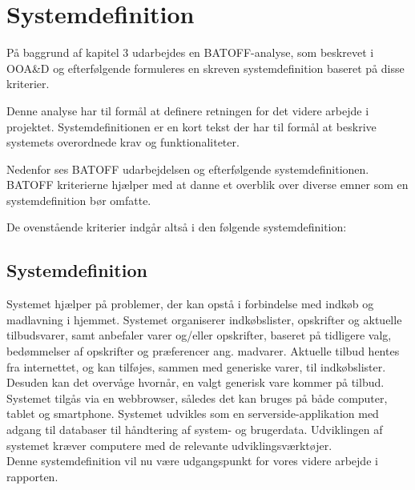 \section{Systemdefinition}
På baggrund af kapitel 3 udarbejdes en BATOFF-analyse, som beskrevet i OOA\&D\citep{OOA&D2001} og efterfølgende formuleres en skreven systemdefinition baseret på disse kriterier.

Denne analyse har til formål at definere retningen for det videre arbejde i projektet.
Systemdefinitionen er en kort tekst der har til formål at beskrive systemets overordnede krav og funktionaliteter.

Nedenfor ses BATOFF udarbejdelsen og efterfølgende systemdefinitionen.
BATOFF kriterierne hjælper med at danne et overblik over diverse emner som en systemdefinition bør omfatte.



De ovenstående kriterier indgår altså i den følgende systemdefinition:

\subsection{Systemdefinition}\label{Sysdef}

Systemet hjælper på problemer, der kan opstå i forbindelse med indkøb og madlavning i hjemmet.
Systemet organiserer indkøbslister, opskrifter og aktuelle tilbudsvarer, samt anbefaler varer og/eller opskrifter, baseret på tidligere valg, bedømmelser af opskrifter og præferencer ang. madvarer.
Aktuelle tilbud hentes fra internettet, og kan tilføjes, sammen med generiske varer, til indkøbslister.
Desuden kan det overvåge hvornår, en valgt generisk vare kommer på tilbud.
Systemet tilgås via en webbrowser, således det kan bruges på både computer, tablet og smartphone.
Systemet udvikles som en serverside-applikation med adgang til databaser til håndtering af system- og brugerdata.
Udviklingen af systemet kræver computere med de relevante udviklingsværktøjer.\\

Denne systemdefinition vil nu være udgangspunkt for vores videre arbejde i rapporten.
